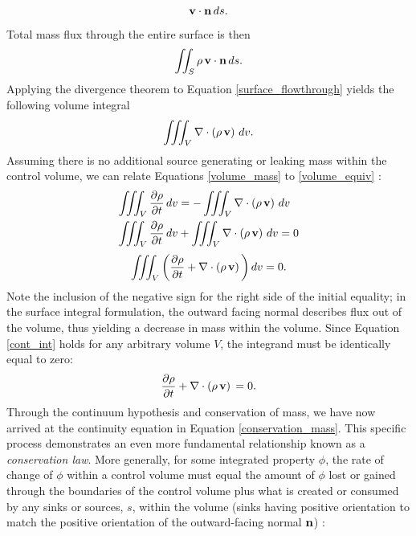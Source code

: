$$\vb{v}\cdot \vb{n} \, ds.$$
Total mass flux through the entire surface is then
\begin{equation} \label{surface_flowthrough}
\iint_S \rho \, \vb{v}\cdot \vb{n} \, ds.
\end{equation}
Applying the divergence theorem to Equation \eqref{surface_flowthrough} yields the following volume integral
\begin{equation} \label{volume_equiv}
\iiint_V \nabla \cdot \left(\rho \, \vb{v} \right) \, dv.
\end{equation}
Assuming there is no additional source generating or leaking mass within the control volume, we can relate Equations \eqref{volume_mass} to \eqref{volume_equiv} : 
\begin{equation*}
\begin{aligned}
\iiint_{V} \dfrac{\partial \rho}{\partial t}\,dv &= - \iiint_V \nabla \cdot \left(\rho \, \vb{v} \right) \, dv \\ 
\iiint_{V} \dfrac{\partial \rho}{\partial t}\,dv &+ \iiint_V \nabla \cdot \left(\rho \, \vb{v} \right) \, dv  = 0 
\end{aligned}
\end{equation*}
\begin{equation} \label{cont_int}
\iiint_{V} \left( \dfrac{\partial \rho}{\partial t} + \nabla \cdot \left(\rho \, \vb{v} \right) \,\right) dv  = 0.
\end{equation}
Note the inclusion of the negative sign for the right side of the initial equality; in the surface integral formulation, the outward facing normal describes flux out of the volume, thus yielding a decrease in mass within the volume. Since Equation \eqref{cont_int} holds for any arbitrary volume $V$, the integrand must be identically equal to zero:
\begin{equation} \label{conservation_mass}
\dfrac{\partial \rho}{\partial t} +  \nabla \cdot \left(\rho \, \vb{v} \right) \,  = 0.
\end{equation}
Through the continuum hypothesis and conservation of mass, we have now arrived at the continuity equation in Equation \eqref{conservation_mass}. This specific process demonstrates an even more fundamental relationship known as a \textit{conservation law}. More generally, for some integrated property $\phi$, the rate of change of $\phi$ within a control volume must equal the amount of $\phi$ lost or gained through the boundaries of the control volume plus what is created or consumed by any sinks or sources, $s$, within the volume (sinks having positive orientation to match the positive orientation of the outward-facing normal $\vb{n}$) \cite{}: 
